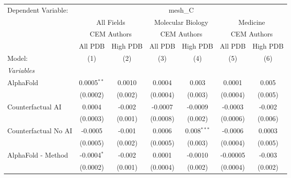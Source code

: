 \begingroup
\centering
\begin{tabular}{lcccccc}
   \tabularnewline \midrule \midrule
   Dependent Variable: & \multicolumn{6}{c}{mesh\_C}\\
 & \multicolumn{2}{c}{All Fields} & \multicolumn{2}{c}{Molecular Biology} & \multicolumn{2}{c}{Medicine} \\
\cmidrule(lr){2-3} \cmidrule(lr){4-5} \cmidrule(lr){6-7}
 & \multicolumn{2}{c}{CEM Authors} & \multicolumn{2}{c}{CEM Authors} & \multicolumn{2}{c}{CEM Authors} \\
\cmidrule(lr){2-3} \cmidrule(lr){4-5} \cmidrule(lr){6-7}
 & \multicolumn{1}{c}{All PDB} & \multicolumn{1}{c}{High PDB} & \multicolumn{1}{c}{All PDB} & \multicolumn{1}{c}{High PDB} & \multicolumn{1}{c}{All PDB} & \multicolumn{1}{c}{High PDB} \\
\cmidrule(lr){2-2} \cmidrule(lr){3-3} \cmidrule(lr){4-4} \cmidrule(lr){5-5} \cmidrule(lr){6-6} \cmidrule(lr){7-7}
   Model:                                                     & (1)           & (2)          & (3)      & (4)            & (5)           & (6)\\  
   \midrule
   \emph{Variables}\\
   AlphaFold                                                  & 0.0005$^{**}$ & 0.0010       & 0.0004   & 0.003          & 0.0001        & 0.005\\   
                                                              & (0.0002)      & (0.002)      & (0.0004) & (0.003)        & (0.0004)      & (0.005)\\   
   Counterfactual AI                                          & 0.0004        & -0.002       & -0.0007  & -0.0009        & -0.0003       & -0.002\\   
                                                              & (0.0003)      & (0.001)      & (0.0008) & (0.002)        & (0.0006)      & (0.006)\\   
   Counterfactual No AI                                       & -0.0005       & -0.001       & 0.0006   & 0.008$^{***}$  & -0.0006       & 0.0003\\   
                                                              & (0.0005)      & (0.002)      & (0.0005) & (0.003)        & (0.0004)      & (0.005)\\   
   AlphaFold - Method                                         & -0.0004$^{*}$ & -0.002       & 0.0001   & -0.0010        & -0.00005      & -0.003\\   
                                                              & (0.0002)      & (0.001)      & (0.0004) & (0.002)        & (0.0004)      & (0.002)\\   

\end{tabular}

